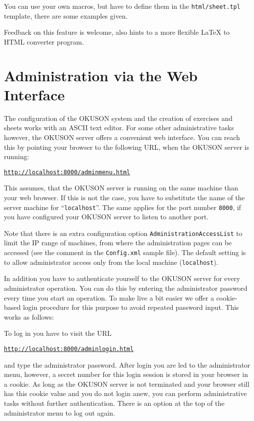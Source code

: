 \documentclass[12pt,openany,a4paper]{book}
\newcommand{\OKUSON}{\textsf{OKUSON}}
\begin{document}
You can use your own macros, but have to define them in the
\texttt{html/sheet.tpl} template, there are some examples given.

Feedback on this feature is welcome, also hints to a more flexible \LaTeX{}
to HTML converter program.

\chapter{Administration via the Web Interface}
\label{ch:adminpages}

The configuration of the {\OKUSON} system and the creation of exercises and
sheets works with an ASCII text editor. For some other administrative tasks
however, the {\OKUSON} server offers a convenient web interface. You can
reach this by pointing your browser to the following URL, when the {\OKUSON} 
server is running:

\hspace*{5mm}\href{http://localhost:8000/adminmenu.html}%
{\texttt{http://localhost:8000/adminmenu.html}}

This assumes, that the {\OKUSON} server is running on the same machine than 
your web browser. If this is not the case, you have to substitute the name
of the server machine for ``\texttt{localhost}''. The same applies for the
port number \texttt{8000}, if you have configured your {\OKUSON} server
to listen to another port.

Note that there is an extra configuration option 
\texttt{AdministrationAccessList} to limit the IP range of machines, from
where the administration pages can be accessed (see 
the comment in the \texttt{Config.xml} sample file). 
The default setting is to allow administrator
access only from the local machine (\texttt{localhost}).

In addition you have to authenticate yourself to the {\OKUSON} server
for every administrator operation. You can do this by entering the 
administrator password every time you start an operation. To make live
a bit easier we offer a cookie-based login procedure for this purpose to
avoid repeated password input. This works as follows:

To log in you have to visit the URL

\hspace*{5mm}\href{http://localhost:8000/adminlogin.html}%
{\texttt{http://localhost:8000/adminlogin.html}}

and type the administrator password. After login you are led to the
administrator menu, however, a secret number for this login session is
stored in your browser in a cookie. As long as the {\OKUSON} server is
not terminated and your browser still has this cookie value and you do
not login anew, you can perform administrative tasks without further
authentication. There is an option at the top of the administrator menu 
to log out again.
\end{document}
